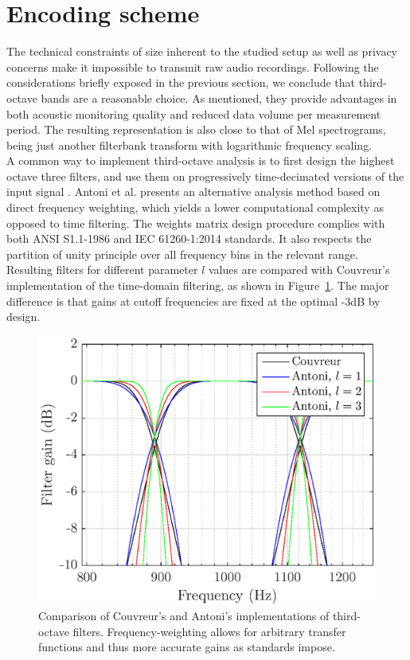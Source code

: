 \documentclass[final,3p,times,twocolumn]{elsarticle}
\begin{document}
\section{Encoding scheme} \label{sec:coder}

The technical constraints of size inherent to the studied setup as well as privacy concerns make it impossible to transmit raw audio recordings. Following the considerations briefly exposed in the previous section, we conclude that third-octave bands are a reasonable choice. As mentioned, they provide advantages in both acoustic monitoring quality and reduced data volume per measurement period. The resulting representation is also close to that of Mel spectrograms, being just another filterbank transform with logarithmic frequency scaling.\\

A common way to implement third-octave analysis is to first design the highest octave three filters, and use them on progressively time-decimated versions of the input signal \cite{davis1986}. Antoni et al. \cite{antoni2010} presents an alternative analysis method based on direct frequency weighting, which yields a lower computational complexity as opposed to time filtering. The weights matrix design procedure complies with both ANSI S1.1-1986 \cite{citeulike:9580295} and IEC 61260-1:2014 \cite{iec-norm} standards. It also respects the partition of unity principle over all frequency bins in the relevant range. Resulting filters for different parameter $l$ values are compared with Couvreur's implementation \cite{couvreur} of the time-domain filtering, as shown in Figure~\ref{fig:freq_filt}. The major difference is that gains at cutoff frequencies are fixed at the optimal -3dB by design.\\

\begin{figure}[htbp]
	\centering
		\includegraphics[width=\columnwidth]{figures/tob_imp.eps}
	\caption{Comparison of Couvreur's and Antoni's implementations of third-octave filters. Frequency-weighting allows for arbitrary transfer functions and thus more accurate gains as standards impose.}
	\label{fig:freq_filt}
\end{figure}
\end{document}
